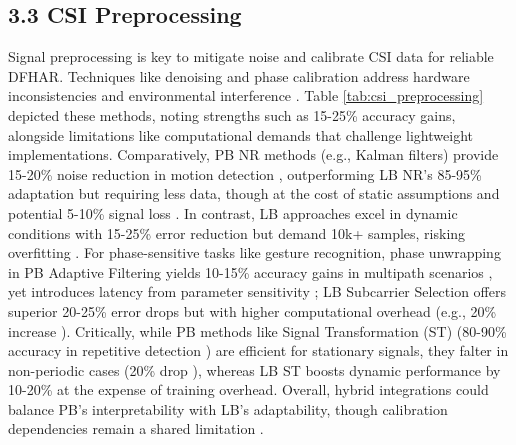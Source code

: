 \documentclass[Afour,sageh,times]{sagej}
\begin{document}
\subsection{3.3 CSI Preprocessing}


Signal preprocessing is key to mitigate noise and calibrate CSI data for reliable DFHAR. Techniques like denoising and phase calibration address hardware inconsistencies and environmental interference \citep{guo2019robust, yang2022deep}. Table \ref{tab:csi_preprocessing} depicted these methods, noting strengths such as 15-25\% accuracy gains, alongside limitations like computational demands that challenge lightweight implementations. Comparatively, PB NR methods (e.g., Kalman filters) provide 15-20\% noise reduction in motion detection \citep{guo2019robust, zeng2021review}, outperforming LB NR's 85-95\% adaptation but requiring less data, though at the cost of static assumptions and potential 5-10\% signal loss \citep{damodaran2020device}. In contrast, LB approaches excel in dynamic conditions with 15-25\% error reduction \citep{guo2019robust, xie2015precise} but demand 10k+ samples, risking overfitting \citep{li2020lidar}. For phase-sensitive tasks like gesture recognition, phase unwrapping in PB Adaptive Filtering yields 10-15\% accuracy gains in multipath scenarios \citep{guo2019robust, zhou2022target}, yet introduces latency from parameter sensitivity \citep{guo2019robust}; LB Subcarrier Selection offers superior 20-25\% error drops \citep{yang2022deep, xie2015precise} but with higher computational overhead (e.g., 20\% increase \citep{huang2020towards}). Critically, while PB methods like Signal Transformation (ST) (80-90\% accuracy in repetitive detection \citep{wang2016gait, wang2020csi}) are efficient for stationary signals, they falter in non-periodic cases (20\% drop \citep{zhang2022wifi}), whereas LB ST boosts dynamic performance by 10-20\% \citep{chen2019dynamic} at the expense of training overhead. Overall, hybrid integrations could balance PB's interpretability with LB's adaptability, though calibration dependencies remain a shared limitation \citep{zeng2021review, li2020lidar}.
\end{document}
